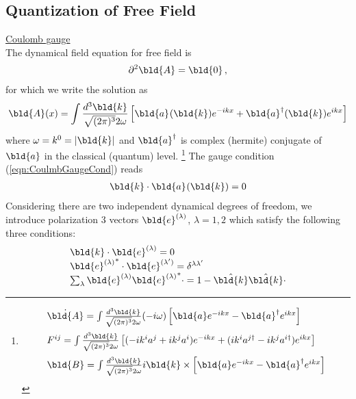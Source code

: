 \subsection{Quantization of Free Field}
\noindent
\underline{Coulomb gauge}\\
The dynamical field equation for free field is
\begin{eqnarray}
\partial^2 \bld{A} = \bld{0}\,,
\end{eqnarray}
for which we write the solution as
\begin{eqnarray}
\bld{A}(x) = \int \frac{d^3 \bld{k}}{\sqrt{(2\pi)^3}2\omega} 
\left[
\bld{a}^{}(\bld{k}) e^{-i k x} + \bld{a}^{\dagger}(\bld{k}) e^{i k x} 
\right]
\label{eqn:CoulPhoAA}
\end{eqnarray}
where $\omega = k^0 = |\bld{k}|$ and $\bld{a}^{\dagger}$ is
complex (hermite) conjugate of $\bld{a}$ in the classical (quantum) level.
\footnote{%
\begin{eqnarray}
\begin{array}{l}
\dot{\bld{A}} =
\int
\frac{d^3 \bld{k}}{\sqrt{(2\pi)^3} 2\omega}
(-i\omega)
\left[
\bld{a} e^{-ikx} - \bld{a}^\dagger e^{ikx}
\right]
\vspace{2mm}
\\
F^{ij} = 
\int
\frac{d^3 \bld{k}}{\sqrt{(2\pi)^3} 2\omega}
\left[
(-ik^i a^j + ik^j a^i )  e^{-ikx}
+
(ik^i a^{j \dagger} - ik^j a^{i \dagger} )  e^{ikx}
\right]
\vspace{2mm}
\\
\bld{B} = 
\int
\frac{d^3 \bld{k}}{\sqrt{(2\pi)^3} 2\omega}
i \bld{k} \times
\left[
\bld{a} e^{-ikx} - \bld{a}^\dagger e^{ikx}
\right]
\end{array}
\end{eqnarray}
}%
The gauge condition (\ref{eqn:CoulmbGaugeCond}) reads
\begin{eqnarray}
\bld{k} \cdot \bld{a}^{} (\bld{k}) = 0
\label{eqn:CoulmbGCondMom}
\end{eqnarray}
Considering there are two independent dynamical degrees of freedom, we introduce
polarization 3 vectors $\bld{e}^{(\lambda)}$, $\lambda = 1, 2$ which satisfy
the following three conditions:
\begin{eqnarray}
\begin{array}{l}
\bld{k} \cdot \bld{e}^{(\lambda)} = 0
\\
{\bld{e}^{(\lambda)}}^* \cdot \bld{e}^{(\lambda')} = \delta^{\lambda \lambda'}
\\
\sum_\lambda \bld{e}^{(\lambda)} {\bld{e}^{(\lambda)}}^* \cdot = 1 - \hat{\bld{k}} \hat{\bld{k}} \cdot
\end{array}
\end{eqnarray}
